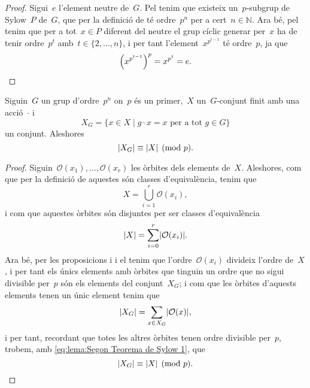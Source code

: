 \documentclass[../../main.tex]{subfiles}
\begin{document}
    \begin{proof}
        Sigui~\(e\) l'element neutre de~\(G\).
        Pel  tenim que existeix un~\(p\)-subgrup de Sylow~\(P\) de~\(G\), que per la definició de  té ordre~\(p^{n}\) per a cert~\(n\in\mathbb{N}\).
        Ara bé, pel  tenim que per a tot~\(x\in P\) diferent del neutre el grup cíclic generar per~\(x\) ha de tenir ordre~\(p^{t}\) amb~\(t\in\{2,\dots,n\}\), i per tant l'element~\(x^{p^{t-1}}\) té ordre~\(p\), ja que
        \[
            \left(x^{p^{t-1}}\right)^{p}=x^{p^{t}}=e.\qedhere
        \]
    \end{proof}
    \begin{lemma}
        \label{lema:Segon Teorema de Sylow}
        Siguin~\(G\) un grup d'ordre~\(p^{n}\) on~\(p\) és un primer,~\(X\) un~\(G\)-conjunt finit amb una acció~\(\cdot\) i
        \[
            X_{G}=\{x\in X\mid g\cdot x=x\text{ per a tot }g\in G\}
        \]
        un conjunt.
        Aleshores
        \[
            \abs{X_{G}}\equiv\abs{X}\pmod{p}.
        \]
    \end{lemma}
    \begin{proof}
        Siguin~\(\mathcal{O}(x_{1}),\dots,\mathcal{O}(x_{r})\) les òrbites dels elements de~\(X\).
        Aleshores, com que per la definició de  aquestes són classes d'equivalència, tenim que %
        \[
            X=\bigcup_{i=1}^{r}\mathcal{O}(x_{i}),
        \]
        i com que aquestes òrbites són disjuntes per ser classes d'equivalència
        \begin{equation}
    \label{eq:lema:Segon Teorema de Sylow 1}
        \abs{X}=\sum_{i=0}^{r}\abs{\mathcal{O}(x_{i})}.
        \end{equation}
        Ara bé, per les proposicions  i  i el  tenim que l'ordre~\(\mathcal{O}(x_{i})\) divideix l'ordre de~\(X\), i per tant els únics elements amb òrbites que tinguin un ordre que no sigui divisible per~\(p\) són els elements del conjunt~\(X_{G}\); i com que les òrbites d'aquests elements tenen un únic element tenim que
        \[
            \abs{X_{G}}=\sum_{x\in X_{G}}\abs{\mathcal{O}(x)},
        \]
        i per tant, recordant que totes les altres òrbites tenen ordre divisible per~\(p\), trobem, amb \eqref{eq:lema:Segon Teorema de Sylow 1}, que
        \[
            \abs{X_{G}}\equiv\abs{X}\pmod{p}.\qedhere
        \]
    \end{proof}
\end{document}
